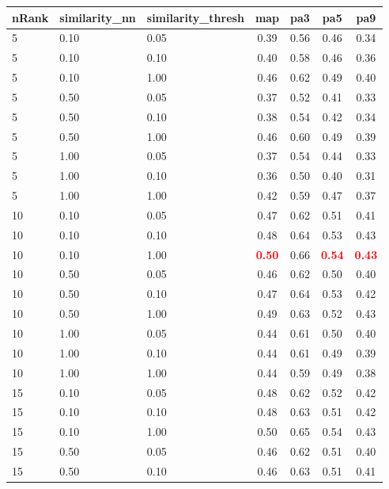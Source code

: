 \documentclass[12pt,a4paper,fleqn]{tufte-handout}
\begin{document}
 
\begin{table}       
\begin{center}       
\scriptsize       
\setlength{\tabcolsep}{.16667em}       
\begin{tabular}{lllcccc}       
nRank & similarity\_nn & similarity\_thresh & map & pa3 & pa5 & pa9 \\       
\hline       
5 & 0.10 & 0.05 & 0.39 & 0.56 & 0.46 & 0.34 \\       
5 & 0.10 & 0.10 & 0.40 & 0.58 & 0.46 & 0.36 \\       
5 & 0.10 & 1.00 & 0.46 & 0.62 & 0.49 & 0.40 \\       
5 & 0.50 & 0.05 & 0.37 & 0.52 & 0.41 & 0.33 \\       
5 & 0.50 & 0.10 & 0.38 & 0.54 & 0.42 & 0.34 \\       
5 & 0.50 & 1.00 & 0.46 & 0.60 & 0.49 & 0.39 \\       
5 & 1.00 & 0.05 & 0.37 & 0.54 & 0.44 & 0.33 \\       
5 & 1.00 & 0.10 & 0.36 & 0.50 & 0.40 & 0.31 \\       
5 & 1.00 & 1.00 & 0.42 & 0.59 & 0.47 & 0.37 \\       
10 & 0.10 & 0.05 & 0.47 & 0.62 & 0.51 & 0.41 \\       
10 & 0.10 & 0.10 & 0.48 & 0.64 & 0.53 & 0.43 \\       
10 & 0.10 & 1.00 & \textbf{\textcolor{red}{0.50}} & 0.66 & \textbf{\textcolor{red}{0.54}} & \textbf{\textcolor{red}{0.43}} \\       
10 & 0.50 & 0.05 & 0.46 & 0.62 & 0.50 & 0.40 \\       
10 & 0.50 & 0.10 & 0.47 & 0.64 & 0.53 & 0.42 \\       
10 & 0.50 & 1.00 & 0.49 & 0.63 & 0.52 & 0.43 \\       
10 & 1.00 & 0.05 & 0.44 & 0.61 & 0.50 & 0.40 \\       
10 & 1.00 & 0.10 & 0.44 & 0.61 & 0.49 & 0.39 \\       
10 & 1.00 & 1.00 & 0.44 & 0.59 & 0.49 & 0.38 \\       
15 & 0.10 & 0.05 & 0.48 & 0.62 & 0.52 & 0.42 \\       
15 & 0.10 & 0.10 & 0.48 & 0.63 & 0.51 & 0.42 \\       
15 & 0.10 & 1.00 & 0.50 & 0.65 & 0.54 & 0.43 \\       
15 & 0.50 & 0.05 & 0.46 & 0.62 & 0.51 & 0.40 \\       
15 & 0.50 & 0.10 & 0.46 & 0.63 & 0.51 & 0.41 \\       

\end{tabular}
\end{center}
\end{table}
\end{document}
